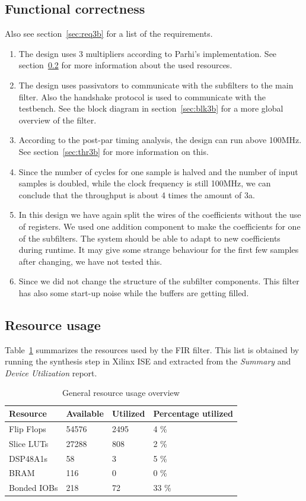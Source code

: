 \documentclass[a4paper,twoside,11pt, fleqn]{article}
\begin{document}
\subsection{Functional correctness}
Also see section~\ref{sec:req3b} for a list of the requirements.
\begin{enumerate}
\item The design uses 3 multipliers according to Parhi's implementation. See section~\ref{sec:resc3b} for more information about the used resources. 
\item The design uses passivators to communicate with the subfilters to the main filter. Also the handshake protocol is used to communicate with the testbench. See the block diagram in section~\ref{sec:blk3b} for a more global overview of the filter. 
\item According to the post-par timing analysis, the design can run above 100MHz. See section~\ref{sec:thr3b} for more information on this.
\item Since the number of cycles for one sample is halved and the number of input samples is doubled, while the clock frequency is still 100MHz, we can conclude that the throughput is about 4 times the amount of 3a.
\item In this design we have again split the wires of the coefficients without the use of registers. We used one addition component to make the coefficients for one of the subfilters. The system should be able to adapt to new coefficients during runtime. It may give some strange behaviour for the first few samples after changing, we have not tested this.
\item Since we did not change the structure of the subfilter components. This filter has also some start-up noise while the buffers are getting filled.
\end{enumerate}

\subsection{Resource usage}
\label{sec:resc3b}

Table~\ref{tab:3busage} summarizes the resources used by the FIR filter. This list is obtained by running the synthesis step in Xilinx ISE and extracted from the \textit{Summary} and \textit{Device Utilization} report.

\begin{table}[h]
\begin{tabular}{|l|l|l|l|}
\hline
\textbf{Resource} & \textbf{Available} & \textbf{Utilized} & \textbf{Percentage utilized}\\
\hline
Flip Flops	& 54576 & 2495 	& 4 \%\\
Slice LUTs 	& 27288 & 808 	& 2 \%\\
DSP48A1s	& 58 	& 3 	& 5 \%\\
BRAM		& 116 	& 0 	& 0 \%\\
Bonded IOBs	& 218 	& 72 	& 33 \%\\
\hline
\end{tabular}
\caption{General resource usage overview}
\label{tab:3busage}
\end{table}
\end{document}
